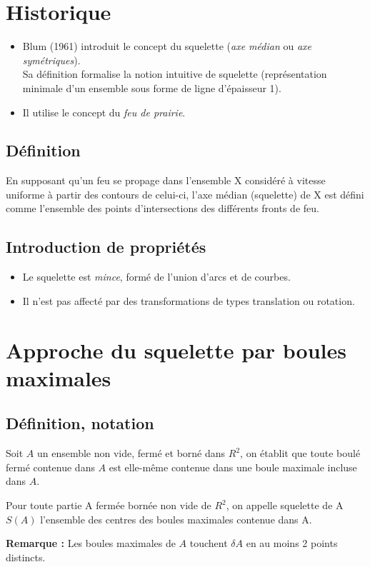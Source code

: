 \documentclass[11pt]{article}
\begin{document}
\section{Historique}
	\begin{itemize}
	\item Blum (1961) introduit le concept du squelette (\textit{axe médian} ou \textit{axe symétriques}). \\
	Sa définition formalise la notion intuitive de squelette (représentation minimale d'un ensemble sous forme de ligne d'épaisseur 1).
	\item Il utilise le concept du \textit{feu de prairie}.
	\end{itemize}

	\subsection{Définition}
		En supposant qu'un feu se propage dans l'ensemble X considéré à vitesse uniforme à partir des contours de celui-ci, l'axe médian (squelette) de X est défini comme l'ensemble des points d'intersections des différents fronts de feu.

	\subsection{Introduction de propriétés}
		\begin{itemize}
		\item Le squelette est \textit{mince}, formé de l'union d'arcs et de courbes.
		\item Il n'est pas affecté par des transformations de types translation ou rotation.
		\end{itemize}

\section{Approche du squelette par boules maximales}
	\subsection{Définition, notation}
		Soit $A$ un ensemble non vide, fermé et borné dans $R^2$, on établit que toute boulé fermé contenue dans $A$ est elle-même contenue dans une boule maximale incluse dans $A$.

		Pour toute partie A  fermée bornée non vide de $R^2$, on appelle squelette de A $S(A)$ l'ensemble des centres des boules maximales contenue dans A.

		\textbf{Remarque :} Les boules maximales de  $A$ touchent $\delta A$ en au moins 2 points distincts.
\end{document}
